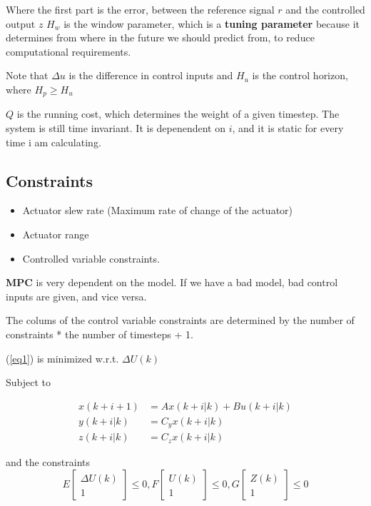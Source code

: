 \documentclass[a4paper]{article}
\begin{document}
Where the first part is the error, between the reference signal $ r $ and the controlled output  $ z $
 $ H_w $ is the window parameter, which is a  \textbf{tuning parameter} because it determines from where in the future we should predict from, to reduce computational requirements.

Note that $ \Delta u$ is the difference in control inputs and  $ H_u $ is the control horizon, where  $ H_p \geq H_u $

$ Q $ is the running cost, which determines the weight of a given timestep. The system is still time invariant. It is depenendent on $ i $, and it is static for every time i am calculating. 


\subsection{Constraints}
\begin{itemize}
	\item Actuator slew rate (Maximum rate of change of the actuator)
	\item Actuator range
	\item Controlled variable constraints.
\end{itemize}

\textbf{MPC} is very dependent on the model. If we have a bad model, bad control inputs are given, and vice versa. 


The colums of the control variable constraints are determined by the number of constraints * the number of timesteps + 1.

(\ref{eq1}) is minimized w.r.t. $ \Delta U(k) $

Subject to

\begin{align}
x(k+i+1) &= A x(k+i|k) + B u(k+i|k)  \\
y(k+i|k) &= C_y x(k+i|k) \\
z(k+i|k) &= C_z x(k+i|k) 
\end{align}


and the constraints 
\begin{equation}
E \begin{bmatrix}
\Delta U(k) \\
1
\end{bmatrix} \leq 0 , F \begin{bmatrix}
U(k) \\
1
\end{bmatrix} \leq 0, G \begin{bmatrix}
Z(k) \\
1
\end{bmatrix} \leq 0
\end{equation}
\end{document}
